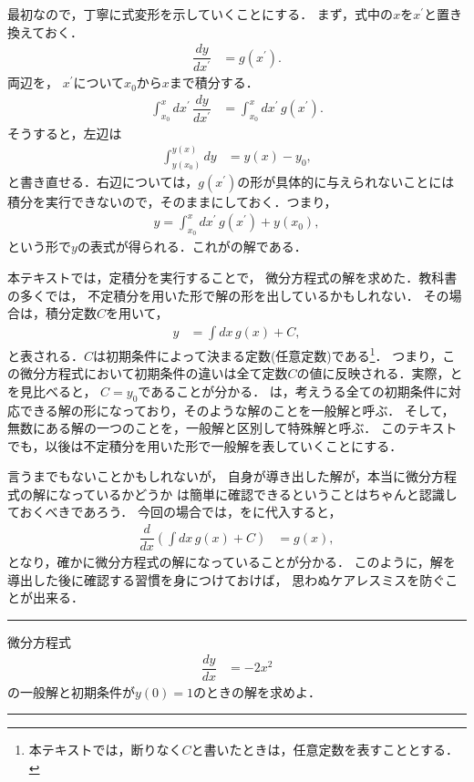 最初なので，丁寧に式変形を示していくことにする．
まず，式中の$x$を$x^\prime$と置き換えておく．
%
\begin{align}
 \dfrac{dy}{dx^{\prime}} & =g\left(x^{\prime}\right).
\end{align}
%
両辺を，
$x^{\prime}$について$x_0$から$x$まで積分する．
\begin{align}
 \int_{x_{0}}^{x}dx^{\prime}\,\dfrac{dy}{dx^{\prime}} & =\int_{x_{0}}^{x}dx^{\prime}\,g\left(x^{\prime}\right). \label{eq:PDE_01_teiseki}
\end{align}
そうすると，左辺は
\begin{align}
 \int_{y\left(x_{0}\right)}^{y\left(x\right)}dy & =y\left(x\right)-y_{0},
\end{align}
と書き直せる．右辺については，$g(x^\prime)$の形が具体的に与えられないことには
積分を実行できないので，そのままにしておく．つまり，
\begin{align}
 y = \int_{x_0}^{x} dx^\prime \, g(x^\prime) + y\left(x_0\right), \label{eq:PDE_01_sol_01}
\end{align}
という形で$y$の表式が得られる．これがの解である．

本テキストでは，定積分を実行することで，
微分方程式の解を求めた．教科書の多くでは，
不定積分を用いた形で解の形を出しているかもしれない．
その場合は，積分定数$C$を用いて，
\begin{align}
y & =\int dx\, g\left(x\right)+C, \label{eq:PDE_01_sol_02}
\end{align}
と表される．$C$は初期条件によって決まる定数(任意定数)である\footnote{本テキストでは，断りなく$C$と書いたときは，任意定数を表すこととする．}．
つまり，この微分方程式において初期条件の違いは全て定数$C$の値に反映される．実際，とを見比べると，
$C=y_0$であることが分かる．
は，考えうる全ての初期条件に対応できる解の形になっており，そのような解のことを一般解と呼ぶ．
そして，無数にある解の一つのことを，一般解と区別して特殊解と呼ぶ．
このテキストでも，以後は不定積分を用いた形で一般解を表していくことにする．

言うまでもないことかもしれないが，
自身が導き出した解が，本当に微分方程式の解になっているかどうか
は簡単に確認できるということはちゃんと認識しておくべきであろう．
今回の場合では，をに代入すると，
\begin{align}
  \dfrac{d}{dx}\left(\int dx\,g\left(x\right)+C\right) & =g\left(x\right),
\end{align}
となり，確かに微分方程式の解になっていることが分かる．
このように，解を導出した後に確認する習慣を身につけておけば，
思わぬケアレスミスを防ぐことが出来る．
%
\newpage
\hrule
\reidai
微分方程式
\begin{align}
 \dfrac{dy}{dx} & =-2x^{2}
\end{align}
の一般解と初期条件が$y(0)=1$のときの解を求めよ．
\vspace*{.2cm}
\hrule
\vspace*{.2cm}

